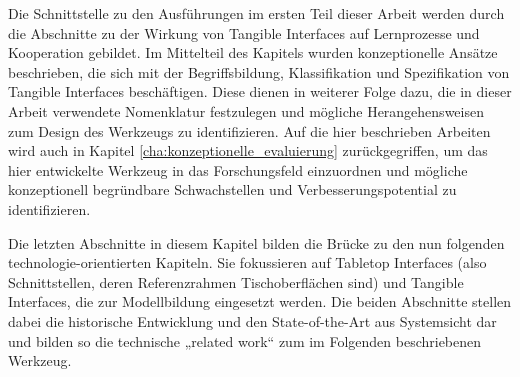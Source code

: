 Die Schnittstelle zu den Ausführungen im ersten Teil dieser Arbeit werden durch die Abschnitte zu der Wirkung von Tangible Interfaces auf Lernprozesse und Kooperation gebildet. Im Mittelteil des Kapitels wurden konzeptionelle Ansätze beschrieben, die sich mit der Begriffsbildung, Klassifikation und Spezifikation von Tangible Interfaces beschäftigen. Diese dienen in weiterer Folge dazu, die in dieser Arbeit verwendete Nomenklatur festzulegen und mögliche Herangehensweisen zum Design des Werkzeugs zu identifizieren. Auf die hier beschrieben Arbeiten wird auch in Kapitel \ref{cha:konzeptionelle_evaluierung} zurückgegriffen, um das hier entwickelte Werkzeug in das Forschungsfeld einzuordnen und mögliche konzeptionell begründbare Schwachstellen und Verbesserungspotential zu identifizieren.

Die letzten Abschnitte in diesem Kapitel bilden die Brücke zu den nun folgenden technologie-orientierten Kapiteln. Sie fokussieren auf Tabletop Interfaces (also Schnittstellen, deren Referenzrahmen Tischoberflächen sind) und Tangible Interfaces, die zur Modellbildung eingesetzt werden. Die beiden Abschnitte stellen dabei die historische Entwicklung und den State-of-the-Art aus Systemsicht dar und bilden so die technische „related work“ zum im Folgenden beschriebenen Werkzeug. 


